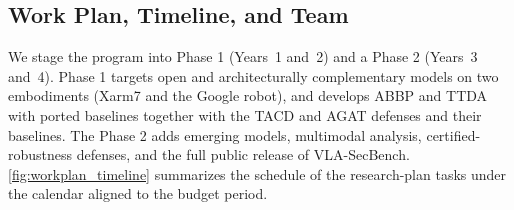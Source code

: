 \subsection{Work Plan, Timeline, and Team} \label{sec:workplan}

 We stage the program into Phase 1 (Years~1 and~2) and a Phase 2 (Years~3 and~4). Phase 1 targets open and architecturally complementary models on two embodiments (Xarm7 and the Google robot), and develops ABBP and TTDA with ported baselines together with the TACD and AGAT defenses and their baselines. 
The Phase 2 adds emerging models, multimodal analysis, certified-robustness defenses, and the full public release of VLA-SecBench. 
\autoref{fig:workplan_timeline} summarizes the schedule of the research-plan tasks under the calendar aligned to the budget period.

